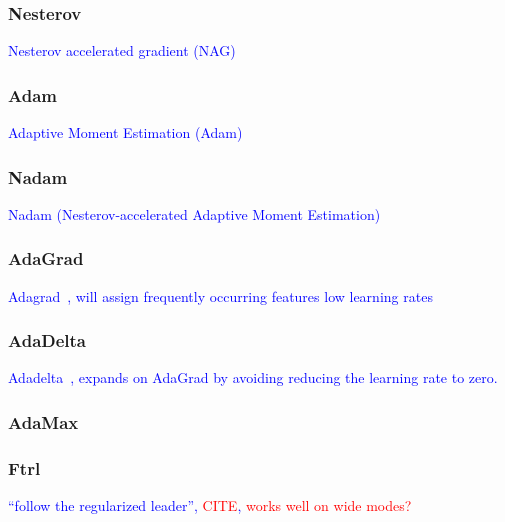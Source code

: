 \subsubsection{Nesterov}

\textcolor{blue}{Nesterov accelerated gradient (NAG)}

\subsubsection{Adam}

\textcolor{blue}{Adaptive Moment Estimation (Adam)~\cite{kingma2014adam}}



\subsubsection{Nadam}

\textcolor{blue}{Nadam (Nesterov-accelerated Adaptive Moment Estimation)~\cite{dozat2016incorporating}}

\subsubsection{AdaGrad}

\textcolor{blue}{Adagrad~\cite{duchi2011adaptive}, will assign frequently occurring features low learning rates}

\subsubsection{AdaDelta}

\textcolor{blue}{Adadelta~\cite{zeiler2012adadelta}, expands on AdaGrad by avoiding reducing the learning rate to zero.}

\subsubsection{AdaMax}

\subsubsection{Ftrl}

\textcolor{blue}{``follow the regularized leader'', \textcolor{red}{CITE}, \textcolor{red}{works well on wide modes?}}





